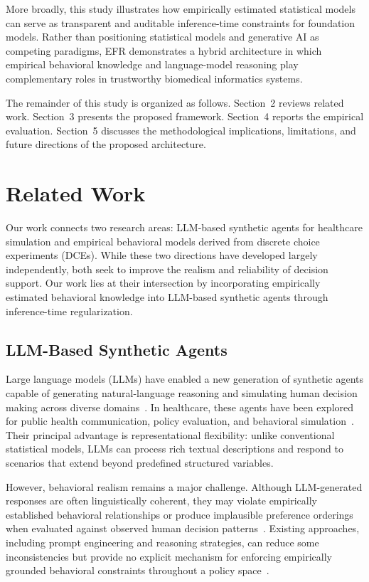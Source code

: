 \documentclass[11pt]{article}
\begin{document}
More broadly, this study illustrates how empirically estimated statistical models can serve as transparent and auditable inference-time constraints for foundation models. Rather than positioning statistical models and generative AI as competing paradigms, EFR demonstrates a hybrid architecture in which empirical behavioral knowledge and language-model reasoning play complementary roles in trustworthy biomedical informatics systems.

The remainder of this study is organized as follows. Section~2 reviews related work. Section~3 presents the proposed framework. Section~4 reports the empirical evaluation. Section~5 discusses the methodological implications, limitations, and future directions of the proposed architecture.

\section{Related Work}

Our work connects two research areas: LLM-based synthetic agents for healthcare simulation and empirical behavioral models derived from discrete choice experiments (DCEs). While these two directions have developed largely independently, both seek to improve the realism and reliability of decision support. Our work lies at their intersection by incorporating empirically estimated behavioral knowledge into LLM-based synthetic agents through inference-time regularization.

\subsection{LLM-Based Synthetic Agents}

Large language models (LLMs) have enabled a new generation of synthetic agents capable of generating natural-language reasoning and simulating human decision making across diverse domains~\citep{Bommasani2021, Park2023a, Mu2024}. In healthcare, these agents have been explored for public health communication, policy evaluation, and behavioral simulation~\citep{Sehgal2025, Gullison2025}. Their principal advantage is representational flexibility: unlike conventional statistical models, LLMs can process rich textual descriptions and respond to scenarios that extend beyond predefined structured variables.

However, behavioral realism remains a major challenge. Although LLM-generated responses are often linguistically coherent, they may violate empirically established behavioral relationships or produce implausible preference orderings when evaluated against observed human decision patterns~\citep{Aher2022TuringExperiments, Horton2023, hintze2025nonlinear}. Existing approaches, including prompt engineering and reasoning strategies, can reduce some inconsistencies but provide no explicit mechanism for enforcing empirically grounded behavioral constraints throughout a policy space~\citep{wang2025simulate, wang2025heating}.
\end{document}
